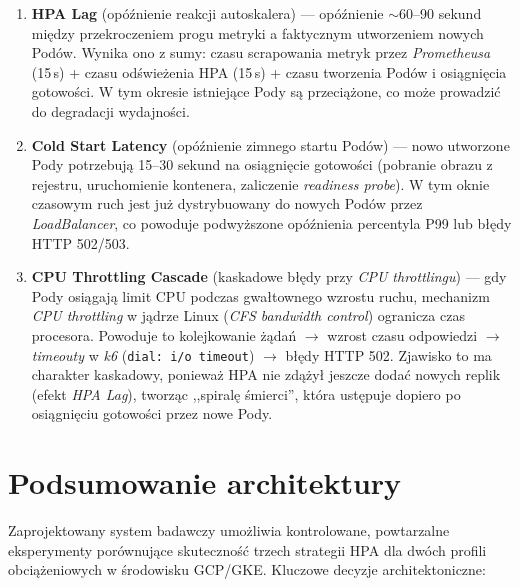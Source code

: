 \begin{enumerate}
  \item \textbf{HPA Lag} (opóźnienie reakcji autoskalera) — opóźnienie $\sim$60--90 sekund między przekroczeniem progu metryki a faktycznym utworzeniem nowych Podów. Wynika ono z sumy: czasu scrapowania metryk przez \textit{Prometheusa} (15\,s) + czasu odświeżenia HPA (15\,s) + czasu tworzenia Podów i osiągnięcia gotowości. W tym okresie istniejące Pody są przeciążone, co może prowadzić do degradacji wydajności.
  
  \item \textbf{Cold Start Latency} (opóźnienie zimnego startu Podów) — nowo utworzone Pody potrzebują 15--30 sekund na osiągnięcie gotowości (pobranie obrazu z rejestru, uruchomienie kontenera, zaliczenie \textit{readiness probe}). W tym oknie czasowym ruch jest już dystrybuowany do nowych Podów przez \textit{LoadBalancer}, co powoduje podwyższone opóźnienia percentyla P99 lub błędy HTTP 502/503.
  
  \item \textbf{CPU Throttling Cascade} (kaskadowe błędy przy \textit{CPU throttlingu}) — gdy Pody osiągają limit CPU podczas gwałtownego wzrostu ruchu, mechanizm \textit{CPU throttling} w jądrze Linux (\textit{CFS bandwidth control}) ogranicza czas procesora. Powoduje to kolejkowanie żądań $\rightarrow$ wzrost czasu odpowiedzi $\rightarrow$ \textit{timeouty} w \textit{k6} (\texttt{dial: i/o timeout}) $\rightarrow$ błędy HTTP 502. Zjawisko to ma charakter kaskadowy, ponieważ HPA nie zdążył jeszcze dodać nowych replik (efekt \textit{HPA Lag}), tworząc ,,spiralę śmierci'', która ustępuje dopiero po osiągnięciu gotowości przez nowe Pody.
\end{enumerate}

\section{Podsumowanie architektury}

Zaprojektowany system badawczy umożliwia kontrolowane, powtarzalne eksperymenty porównujące skuteczność trzech strategii HPA dla dwóch profili obciążeniowych w środowisku GCP/GKE. Kluczowe decyzje architektoniczne:

